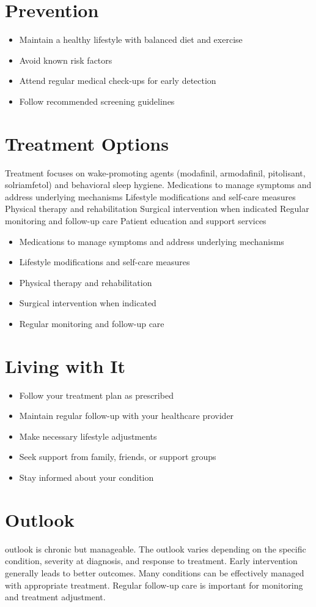 \section{Prevention}
\begin{itemize}[noitemsep]
  \item Maintain a healthy lifestyle with balanced diet and exercise
  \item Avoid known risk factors
  \item Attend regular medical check-ups for early detection
  \item Follow recommended screening guidelines
\end{itemize}
\section{Treatment Options}
Treatment focuses on wake-promoting agents (modafinil, armodafinil, pitolisant, solriamfetol) and behavioral sleep hygiene. Medications to manage symptoms and address underlying mechanisms Lifestyle modifications and self-care measures Physical therapy and rehabilitation Surgical intervention when indicated Regular monitoring and follow-up care Patient education and support services

\begin{itemize}[noitemsep]
  \item Medications to manage symptoms and address underlying mechanisms
  \item Lifestyle modifications and self-care measures
  \item Physical therapy and rehabilitation
  \item Surgical intervention when indicated
  \item Regular monitoring and follow-up care
\end{itemize}
\section{Living with It}
\begin{itemize}[noitemsep]
  \item Follow your treatment plan as prescribed
  \item Maintain regular follow-up with your healthcare provider
  \item Make necessary lifestyle adjustments
  \item Seek support from family, friends, or support groups
  \item Stay informed about your condition
\end{itemize}
\section{Outlook}
outlook is chronic but manageable. The outlook varies depending on the specific condition, severity at diagnosis, and response to treatment. Early intervention generally leads to better outcomes. Many conditions can be effectively managed with appropriate treatment. Regular follow-up care is important for monitoring and treatment adjustment.
